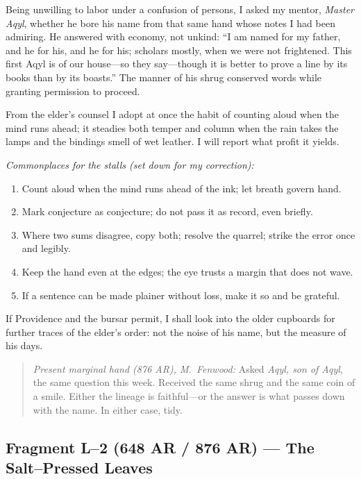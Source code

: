 \documentclass[11pt]{article}
\numberwithin{equation}{section} %
\theoremstyle{plain} %
\theoremstyle{definition} %
\theoremstyle{remark} %
\begin{document}
Being unwilling to labor under a confusion of persons, I asked my mentor, \textit{Master Aqyl}, whether he bore his name from that same hand whose notes I had been admiring. He answered with economy, not unkind: “I am named for my father, and he for his, and he for his; scholars mostly, when we were not frightened. This first Aqyl is of our house—so they say—though it is better to prove a line by its books than by its boasts.” The manner of his shrug conserved words while granting permission to proceed.

From the elder’s counsel I adopt at once the habit of counting aloud when the mind runs ahead; it steadies both temper and column when the rain takes the lamps and the bindings smell of wet leather. I will report what profit it yields.

\medskip
\noindent\textit{Commonplaces for the stalls (set down for my correction):}
\begin{enumerate}\setlength\itemsep{0.25em}
  \item Count aloud when the mind runs ahead of the ink; let breath govern hand.
  \item Mark conjecture as conjecture; do not pass it as record, even briefly.
  \item Where two sums disagree, copy both; resolve the quarrel; strike the error once and legibly.
  \item Keep the hand even at the edges; the eye trusts a margin that does not wave.
  \item If a sentence can be made plainer without loss, make it so and be grateful.
\end{enumerate}

If Providence and the bursar permit, I shall look into the older cupboards for further traces of the elder’s order: not the noise of his name, but the measure of his days.

\medskip
\begin{quote}\small
\textit{Present marginal hand (876 AR), M.\ Fenwood:} Asked \textit{Aqyl, son of Aqyl}, the same question this week. Received the same shrug and the same coin of a smile. Either the lineage is faithful—or the answer is what passes down with the name. In either case, tidy.
\end{quote}

\subsection{Fragment L--2 (648 AR / 876 AR) — The Salt–Pressed Leaves}
\label{frag:l2}
\end{document}
